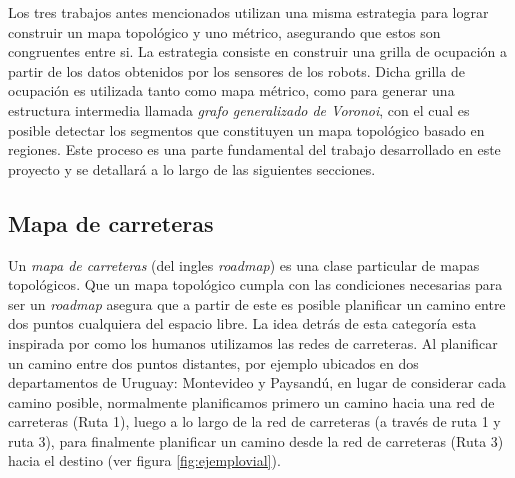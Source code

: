 Los tres trabajos antes mencionados utilizan una misma estrategia para lograr construir un mapa topológico y uno métrico, asegurando que estos son congruentes entre si. La estrategia consiste en construir una grilla de ocupación a partir de los datos obtenidos por los sensores de los robots. Dicha grilla de ocupación es utilizada tanto como mapa métrico, como para generar una estructura intermedia llamada \emph{grafo generalizado de Voronoi}, con el cual es posible detectar los segmentos que constituyen un mapa topológico basado en regiones. Este proceso es una parte fundamental del trabajo desarrollado en este proyecto y se detallará a lo largo de las siguientes secciones.%

\subsection{Mapa de carreteras}\label{subsec:mapacarr}
Un \emph{mapa de carreteras} (del ingles \emph{roadmap}) \cite{choset2005principles} es una clase particular de mapas topológicos. Que un mapa topológico cumpla con las condiciones necesarias para ser un \emph{roadmap} asegura que a partir de este es posible planificar un camino entre dos puntos cualquiera del espacio libre. La idea detrás de esta categoría esta inspirada por como los humanos utilizamos las redes de carreteras. Al planificar un camino entre dos puntos distantes, por ejemplo ubicados en dos departamentos de Uruguay: Montevideo y Paysandú, en lugar de considerar cada camino posible, normalmente planificamos primero un camino hacia una red de carreteras (Ruta 1), luego a lo largo de la red de carreteras (a través de ruta 1 y ruta 3), para finalmente planificar un camino desde la red de carreteras (Ruta 3) hacia el destino (ver figura \ref{fig:ejemplovial}). 

